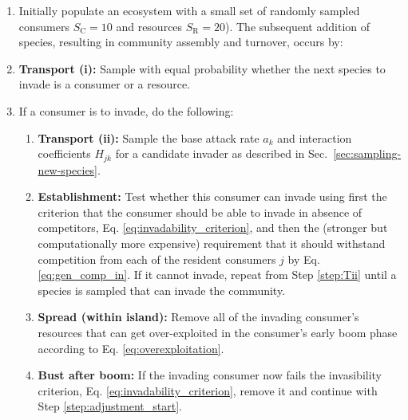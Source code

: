 \documentclass[a4paper]{report}
\begin{document}
\begin{enumerate}

\item Initially populate
 an ecosystem with a small set of randomly sampled consumers 
  $S_{\mathrm{C}}=10$ and resources $S_{\mathrm{R}}=20$). The subsequent addition of species, resulting in community assembly and turnover, occurs by:
\item \textbf{Transport (i):} Sample with equal probability whether the next species to invade is a consumer or a resource. \label{step:Ti}
\item If a consumer is to invade, do the following:
\begin{enumerate}
\item \textbf{Transport (ii):} Sample the base attack rate $a_k$ and interaction coefficients $H_{jk}$ for a candidate invader as described in Sec.~\ref{sec:sampling-new-species}.\label{step:Tii}

\item \textbf{Establishment:} Test whether this consumer can invade using first the criterion that the consumer should be able to invade in absence of competitors, Eq. \eqref{eq:invadability_criterion}, and then the (stronger but computationally more expensive) requirement that it should withstand competition from each of the resident consumers $j$ by Eq. \eqref{eq:gen_comp_in}. If it cannot invade, repeat from Step \ref{step:Tii} until a species is sampled that can invade the community. \item \textbf{Spread (within island):} Remove all of the invading consumer's resources that can get over-exploited in the consumer's early boom phase according to Eq. \eqref{eq:overexploitation}.

\item \textbf{Bust after boom:} If the invading consumer now fails the invasibility criterion, Eq. \eqref{eq:invadability_criterion}, remove it and continue with Step \ref{step:adjustment_start}.


\end{enumerate}
\end{enumerate}
\end{document}
